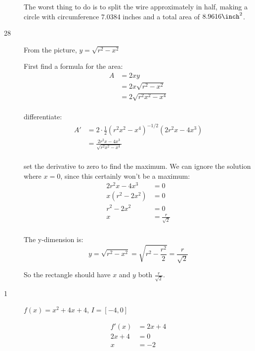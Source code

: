 \documentclass[fleqn]{exam}
\begin{document}
\begin{description}
The worst thing to do is to split the wire approximately in half, making a circle with circumference 7.0384 inches and a
total area of $8.9616 \inch^2$.

\pagebreak

\item[28]

From the picture, $y = \sqrt{r^2 - x^2}$

First find a formula for the area:
\begin{align*}
  A &= 2xy \\
      &= 2x \sqrt{r^2 - x^2} \\
      &= 2 \sqrt{r^2x^2 - x^4} \\
\end{align*}

differentiate:
\begin{align*}
  A' &= 2 \cdot \frac{1}{2}(r^2x^2 - x^4)^{-1/2}(2r^2x - 4x^3) \\
     &= \frac{2r^2x - 4x^3}{\sqrt{r^2x^2 - x^4}} \\
\end{align*}

set the derivative to zero to find the maximum.  We can ignore the solution where $x=0$, since this certainly won't be a maximum:
\begin{align*}
  2r^2x - 4x^3 &= 0 \\
  x(r^2 - 2x^2) &= 0 \\
  r^2 - 2x^2 &= 0 \\
  x &= \frac{r}{\sqrt{2}} \\
\end{align*}

The y-dimension is:
\[
  y = \sqrt{r^2 - x^2} = \sqrt{r^2 - \frac{r^2}{2}} = \frac{r}{\sqrt{2}} 
\]

So the rectangle should have $x$ and $y$ both $\frac{r}{\sqrt{2}}$.

\pagebreak


\item[1]
$f(x) = x^2 + 4x + 4$, $I = [-4, 0]$

\begin{align*}
  f'(x) &= 2x + 4 \\
  2x + 4 &= 0 \\
  x &= -2 \\
\end{align*}


\end{description}
\end{document}
